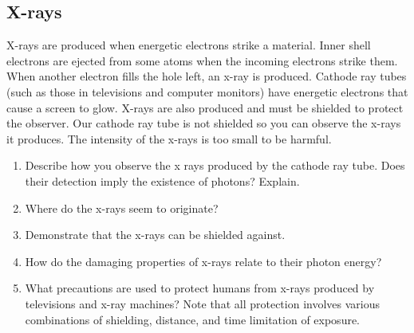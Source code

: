 \subsection {X-rays}
X-rays are produced when energetic electrons strike a material.  Inner shell electrons are ejected from some atoms when the incoming electrons strike them.  When another electron fills the hole left, an x-ray is produced.  Cathode ray tubes (such as those in televisions and computer monitors) have energetic electrons that cause a screen to glow.  X-rays are also produced and must be shielded to protect the observer.  Our cathode ray tube is not shielded so you can observe the x-rays it produces.  The intensity of the x-rays is too small to be harmful.
\begin{enumerate}
	\item Describe how you observe the x rays produced by the cathode ray tube.  Does their detection imply the existence of photons?  Explain.
	\item Where do the x-rays seem to originate?
	\item Demonstrate that the x-rays can be shielded against.
	\item How do the damaging properties of x-rays relate to their photon energy?
	\item What precautions are used to protect humans from x-rays produced by televisions and x-ray machines?  Note that all protection involves various combinations of shielding, distance, and time limitation of exposure.
\end{enumerate}


